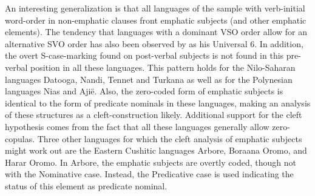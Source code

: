 An interesting generalization is that all languages of the sample with verb-initial word-order in non-emphatic clauses front emphatic subjects (and other emphatic elements). 
The tendency that languages with a dominant VSO order allow for an alternative SVO order has also been observed by \citet{Greenberg:1963} as his Universal 6. 
In addition, the overt S-case-marking found on post-verbal subjects is not found in this pre-verbal position in all these languages. 
This pattern holds for the Nilo-Saharan languages Datooga, Nandi, Tennet and Turkana as well as for the Polynesian languages Nias and Aji\"e. 
Also, the zero-coded form of emphatic subjects is identical to the form of predicate nominals in these languages, making an analysis of these structures as a cleft-construction likely. Additional support for the cleft hypothesis comes from the fact that all these languages generally allow zero-copulas. 
Three other languages for which the cleft analysis of emphatic subjects might work out are the Eastern Cushitic languages Arbore, Boraana Oromo, and Harar Oromo. 
In Arbore, the emphatic subjects are overtly coded, though not with the Nominative case. 
Instead, the Predicative case is used indicating the status of this element as predicate nominal.  


